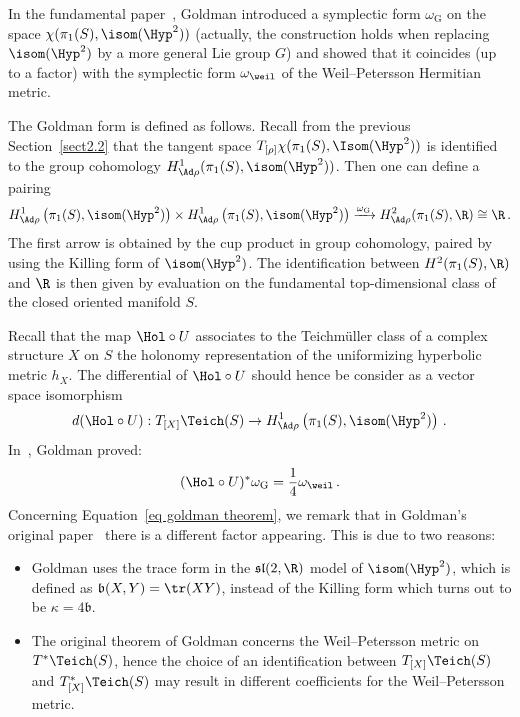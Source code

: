 In the fundamental paper~\cite{Goldman}, Goldman introduced a symplectic form $\omega_{\mathrm G}$ on the space $\chi(\pi_1(S),\isom(\Hyp^2))$ (actually, the construction holds when replacing $\isom(\Hyp^2)$ by a more general Lie group $G$) and showed that it coincides (up to a factor) with the symplectic form $\omega_{\weil}$ of the Weil--Petersson Hermitian metric.

The Goldman form is defined as follows. Recall from the previous Section~\ref{sect2.2} that the tangent space $T_{[\rho]}\chi(\pi_1(S),\Isom(\Hyp^2))$ is identified to the group cohomology $H^1_{\Ad\rho}(\pi_1(S),\isom(\Hyp^2))$. Then one can define a pairing
\[
H^1_{\Ad\rho}\left(\pi_1(S),\isom(\Hyp^2)\right)\times H^1_{\Ad\rho}\left(\pi_1(S),\isom(\Hyp^2)\right)\xrightarrow{\omega_{\mathrm G}} H^2_{\Ad\rho}(\pi_1(S),\R)\cong\R\,.
\]
The first arrow is obtained by the cup product in group cohomology, paired by using the Killing form of $\isom(\Hyp^2)$. The identification between $H^2(\pi_1(S),\R)$ and $\R$ is then given by evaluation on the fundamental top-dimensional class of the closed oriented manifold $S$.

Recall that the map $\Hol\circ U$ associates to the Teichm\"uller class of a complex structure $X$ on $S$ the holonomy representation of the uniformizing hyperbolic metric $h_X$. The differential of $\Hol\circ U$ should hence be consider as a vector space isomorphism
\[
d(\Hol\circ U):T_{[X]}\Teich(S)\to H^1_{\Ad\rho}\left(\pi_1(S),\isom(\Hyp^2)\right)\,.
\]
In~\cite{Goldman}, Goldman proved:
\begin{equation}\label{eq goldman theorem}
(\Hol\circ U)^*\omega_{\mathrm G}=\frac{1}{4}\omega_\weil\,.
\end{equation}
Concerning Equation~\eqref{eq goldman theorem}, we remark that in Goldman's original paper~\cite{Goldman} there is a different factor appearing. This is due to two reasons:
\begin{itemize}
\item Goldman uses the trace form in the $\mathfrak{sl}(2,\R)$ model of $\isom(\Hyp^2)$, which is defined as $\mathfrak b(X,Y)=\tr(XY)$, instead of the Killing form which turns out to be $\kappa=4\mathfrak b$.
\item The original theorem of Goldman concerns the Weil--Petersson metric on $T^*\Teich(S)$, hence the choice of an identification between $T_{[X]}\Teich(S)$ and $T^*_{[X]}\Teich(S)$ may result in different coefficients for the Weil--Petersson metric.
\end{itemize}


